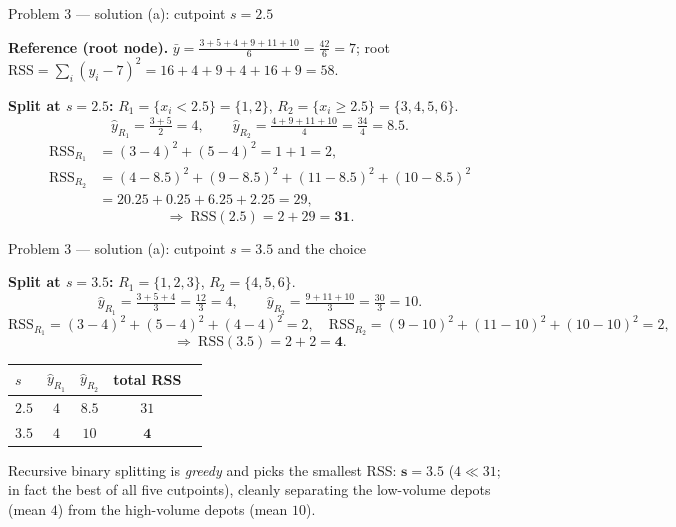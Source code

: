 \documentclass[aspectratio=169,11pt]{beamer}
\begin{document}
\begin{frame}{Problem 3 --- solution (a): cutpoint $s=2.5$}
  \begin{solutionbox}[Solution P3(a) part 1 --- evaluate {$s=2.5$}]
    \textbf{Reference (root node).} $\bar y=\tfrac{3+5+4+9+11+10}{6}=\tfrac{42}{6}=7$; root
    $\mathrm{RSS}=\sum_i(y_i-7)^2=16+4+9+4+16+9=58$.
    \medskip

    \textbf{Split at $s=2.5$:} $R_1=\{x_i<2.5\}=\{1,2\}$, $R_2=\{x_i\ge2.5\}=\{3,4,5,6\}$.
    \[
      \hat y_{R_1}=\tfrac{3+5}{2}=4,\qquad
      \hat y_{R_2}=\tfrac{4+9+11+10}{4}=\tfrac{34}{4}=8.5.
    \]
    \begin{align*}
      \mathrm{RSS}_{R_1}&=(3-4)^2+(5-4)^2=1+1=2,\\
      \mathrm{RSS}_{R_2}&=(4-8.5)^2+(9-8.5)^2+(11-8.5)^2+(10-8.5)^2\\
      &=20.25+0.25+6.25+2.25=29,
    \end{align*}
    \[
      \Longrightarrow\ \mathrm{RSS}(2.5)=2+29=\mathbf{31}.
    \]
  \end{solutionbox}
\end{frame}

\begin{frame}{Problem 3 --- solution (a): cutpoint $s=3.5$ and the choice}
  \begin{solutionbox}[Solution P3(a) part 2 --- evaluate {$s=3.5$} and decide]
    \textbf{Split at $s=3.5$:} $R_1=\{1,2,3\}$, $R_2=\{4,5,6\}$.
    \[
      \hat y_{R_1}=\tfrac{3+5+4}{3}=\tfrac{12}{3}=4,\qquad
      \hat y_{R_2}=\tfrac{9+11+10}{3}=\tfrac{30}{3}=10.
    \]
    \[
      \mathrm{RSS}_{R_1}=(3-4)^2+(5-4)^2+(4-4)^2=2,\quad
      \mathrm{RSS}_{R_2}=(9-10)^2+(11-10)^2+(10-10)^2=2,
    \]
    \[
      \Longrightarrow\ \mathrm{RSS}(3.5)=2+2=\mathbf{4}.
    \]
    \begin{center}\footnotesize
    \begin{tabular}{lcccc}
      \toprule
      $s$ & $\hat y_{R_1}$ & $\hat y_{R_2}$ & total RSS\\
      \midrule
      $2.5$ & $4$ & $8.5$ & $31$\\
      $3.5$ & $4$ & $10$ & $\mathbf{4}$\\
      \bottomrule
    \end{tabular}
    \end{center}
    Recursive binary splitting is \emph{greedy} and picks the smallest RSS: $\mathbf{s=3.5}$
    ($4\ll31$; in fact the best of all five cutpoints), cleanly separating the low-volume depots
    (mean $4$) from the high-volume depots (mean $10$).
  \end{solutionbox}
\end{frame}
\end{document}
